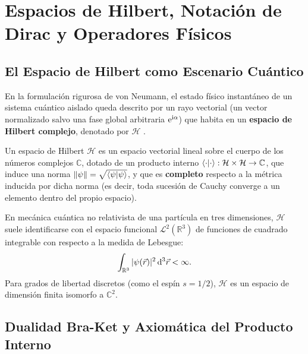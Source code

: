 
\section{Espacios de Hilbert, Notación de Dirac y Operadores Físicos}
\label{sec:espacio_hilbert}

\subsection{El Espacio de Hilbert como Escenario Cuántico}

En la formulación rigurosa de von Neumann, el estado físico instantáneo de un sistema cuántico aislado queda descrito por un rayo vectorial (un vector normalizado salvo una fase global arbitraria $\mathrm{e}^{\mathrm{i}\alpha}$) que habita en un \textbf{espacio de Hilbert complejo}, denotado por $\mathcal{H}$ \cite{dirac, sakurai}.

\begin{teoremabox}
    Un espacio de Hilbert $\mathcal{H}$ es un espacio vectorial lineal sobre el cuerpo de los números complejos $\mathbb{C}$, dotado de un producto interno $\left\langle \cdot \middle| \cdot \right\rangle: \mathcal{H} \times \mathcal{H} \to \mathbb{C}$, que induce una norma $\left\| \psi \right\| = \sqrt{\left\langle \psi \middle| \psi \right\rangle}$, y que es \textbf{completo} respecto a la métrica inducida por dicha norma (es decir, toda sucesión de Cauchy converge a un elemento dentro del propio espacio).
\end{teoremabox}

En mecánica cuántica no relativista de una partícula en tres dimensiones, $\mathcal{H}$ suele identificarse con el espacio funcional $\mathcal{L}^2(\mathbb{R}^3)$ de funciones de cuadrado integrable con respecto a la medida de Lebesgue:
\begin{equation}
    \int_{\mathbb{R}^3} |\psi(\vec{r})|^2\,\mathrm{d}^3\vec{r} < \infty.
    \label{eq:l2_norm}
\end{equation}
Para grados de libertad discretos (como el espín $s = 1/2$), $\mathcal{H}$ es un espacio de dimensión finita isomorfo a $\mathbb{C}^2$.

\subsection{Dualidad Bra-Ket y Axiomática del Producto Interno}

